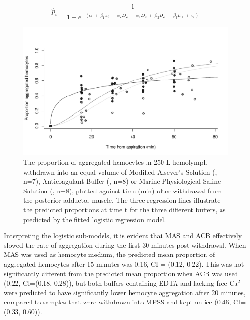 \begin{equation}
\label{eq:logit}
\hat{p}_{i} = \dfrac{1}{1 + e^{-(\alpha \: + \: \beta_{1} x_{i} \: + \: \alpha_{2} D_{2} \: + \: \alpha_{3} D_{3} \: + \: \beta_{2} D_{2} \: + \: \beta_{3} D_{3} \: + \: \epsilon_{i})}}
\end{equation}

\begin{figure}[!ht]
    \centering
    \includegraphics[width=1.0\textwidth]{figures/Method development/agg_plot_scaled.pdf}
    \caption{The proportion of aggregated hemocytes in 250 \micro L hemolymph withdrawn into an equal volume of Modified Alsever's Solution (\protect\lysegraacircle, n=7), Anticoagulant Buffer (\protect\graycircle, n=8) or Marine Physiological Saline Solution (\protect\darkgraycircle, n=8), plotted against time (min) after withdrawal from the posterior adductor muscle. The three regression lines illustrate the predicted proportions at time t for the three different buffers, as predicted by the fitted logistic regression model.}
    \label{fig:aggregation}
\end{figure}

Interpreting the logistic sub-models, it is evident that MAS and ACB effectively slowed the rate of aggregation during the first 30 minutes post-withdrawal. When MAS was used as hemocyte medium, the predicted mean proportion of aggregated hemocytes after 15 minutes was 0.16, CI = (0.12, 0.22). This was not significantly different from the predicted mean proportion when ACB was used (0.22, CI=(0.18, 0.28)), but both buffers containing EDTA and lacking free Ca$^{2+}$ were predicted to have significantly lower hemocyte aggregation after 20 minutes, compared to samples that were withdrawn into MPSS and kept on ice (0.46, CI=(0.33, 0.60)).

